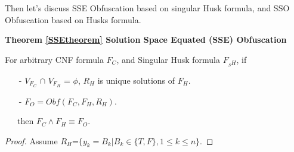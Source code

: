 \documentclass[conference,compsocconf]{IEEEtran}
\begin{document}
Then let's discuss SSE Obfuscation based on singular Husk formula,
and SSO Obfuscation based on Husks formula.

\textbf{Theorem \ref{SSEtheorem} Solution Space Equated (SSE) Obfuscation}

For arbitrary CNF formula $F_C$, and Singular Husk formula $F_{_SH}$, if
\begin{enumerate}
 \item[-] $V_{F_C}$ $\cap$ $V_{F_H}$ = $\phi$, $R_H$ is unique solutions of $F_H$.
 \item[-] $F_O=Obf(F_C,F_H,R_H)$.
\end{enumerate}
~~~then  $F_C\wedge F_H \equiv F_O$.
\begin{proof}

Assume $R_H$=$\{y_k=B_k| B_k \in \{T,F\}, 1\leqslant k\leqslant n\}$.
         

\end{proof}
\end{document}
